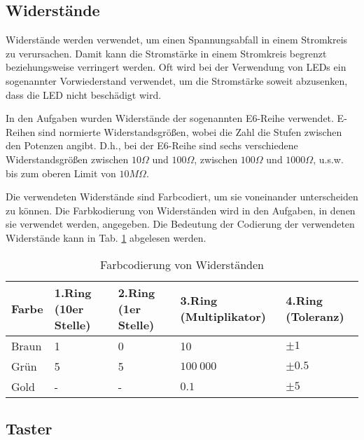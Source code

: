 \subsection{Widerstände}
\label{subsec:widerstände}

Widerstände werden verwendet, um einen Spannungsabfall in einem Stromkreis zu verursachen.
Damit kann die Stromstärke in einem Stromkreis begrenzt beziehungsweise verringert werden.
Oft wird bei der Verwendung von LEDs ein sogenannter Vorwiederstand verwendet, um die Stromstärke soweit abzusenken, dass die LED nicht beschädigt wird.

In den Aufgaben wurden Widerstände der sogenannten E6-Reihe verwendet.
E-Reihen sind normierte Widerstandsgrößen, wobei die Zahl die Stufen zwischen den Potenzen angibt.
D.h., bei der E6-Reihe sind sechs verschiedene Widerstandsgrößen zwischen $10\Omega$ und $100\Omega$, zwischen $100\Omega$ und $1000\Omega$, u.s.w. bis zum oberen Limit von $10M\Omega$.

Die verwendeten Widerstände sind Farbcodiert, um sie voneinander unterscheiden zu können.
Die Farbkodierung von Widerständen wird in den Aufgaben, in denen sie verwendet werden, angegeben.
Die Bedeutung der Codierung der verwendeten Widerstände kann in Tab. \ref{tab:farbcodierung-von-widerständen} abgelesen werden.

\begin{table}
    \begin{adjustwidth}{-2cm}{}
        \caption{Farbcodierung von Widerständen}
        \label{tab:farbcodierung-von-widerständen}
        \begin{tabular}{| l | l | l | l | l |}
            \hline
            Farbe & 1.Ring (10er Stelle) & 2.Ring (1er Stelle) & 3.Ring (Multiplikator) & 4.Ring (Toleranz) \\
            \hline
            Braun & 1                    & 0                   & 10                     & $\pm 1$           \\
            Grün  & 5                    & 5                   & $100\ 000$             & $\pm 0.5$         \\
            Gold  & -                    & -                   & $0.1$                  & $\pm 5$           \\
            \hline
        \end{tabular}
    \end{adjustwidth}
\end{table}

\subsection{Taster}
\label{subsec:taster}

